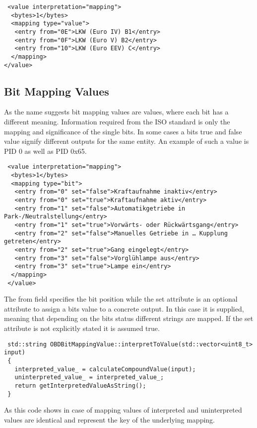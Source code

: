 \begin{verbatim}
 <value interpretation="mapping">
  <bytes>1</bytes>
  <mapping type="value">
   <entry from="0E">LKW (Euro IV) B1</entry>
   <entry from="0F">LKW (Euro V) B2</entry>
   <entry from="10">LKW (Euro EEV) C</entry>
  </mapping>        
</value>
\end{verbatim}

\subsection{Bit Mapping Values}

As the name suggests bit mapping values are values, where each bit has a different meaning. Information required from the ISO standard is only
the mapping and significance of the single bits. In some cases a bits true and false value signify different outputs for the same entity. An 
example of such a value is PID 0 as well as PID 0x65.

\begin{verbatim}
 <value interpretation="mapping">
  <bytes>1</bytes>
  <mapping type="bit">
   <entry from="0" set="false">Kraftaufnahme inaktiv</entry>
   <entry from="0" set="true">Kraftaufnahme aktiv</entry>
   <entry from="1" set="false">Automatikgetriebe in Park-/Neutralstellung</entry>
   <entry from="1" set="true">Vorwärts- oder Rückwärtsgang</entry>
   <entry from="2" set="false">Manuelles Getriebe in … Kupplung getreten</entry>
   <entry from="2" set="true">Gang eingelegt</entry>
   <entry from="3" set="false">Vorglühlampe aus</entry>
   <entry from="3" set="true">Lampe ein</entry>
  </mapping>
 </value>
\end{verbatim}

The from field specifies the bit position while the set attribute is an optional attribute to assign a bits value to a concrete output. In this 
case it is supplied, meaning that depending  on the bits status different strings are mapped. If the set attribute is not explicitly stated it 
is assumed true.

\begin{verbatim}
 std::string OBDBitMappingValue::interpretToValue(std::vector<uint8_t> input)
 {
   interpreted_value_ = calculateCompoundValue(input);
   uninterpreted_value_ = interpreted_value_;
   return getInterpretedValueAsString();
 }
\end{verbatim}

As this code shows in case of mapping values of interpreted and uninterpreted values are identical and represent the key of the underlying mapping.

